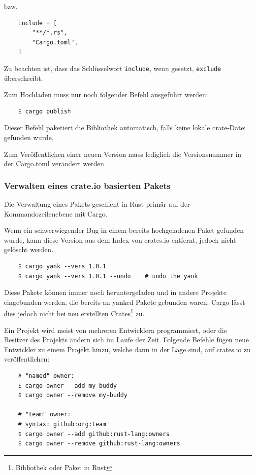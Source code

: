 bzw.

\begin{lstlisting}
    include = [
        "**/*.rs",
        "Cargo.toml",
    ]
\end{lstlisting}

Zu beachten ist, dass das Schlüsselwort \verb"include", wenn gesetzt, \verb"exclude" überschreibt.

Zum Hochladen muss nur noch folgender Befehl ausgeführt werden:

\begin{lstlisting}
    $ cargo publish
\end{lstlisting}

Dieser Befehl paketiert die Bibliothek automatisch, falls keine lokale crate-Datei gefunden wurde.

Zum Veröffentlichen einer neuen Version muss lediglich die Versionsnummer in der Cargo.toml verändert werden.

\subsubsection{Verwalten eines crate.io basierten Pakets}

Die Verwaltung eines Pakets geschieht in Rust primär auf der Kommandozeilenebene mit Cargo.

Wenn ein schwerwiegender Bug in einem bereits hochgeladenen Paket gefunden wurde, kann diese Version aus dem Index von crates.io entfernt, jedoch nicht gelöscht werden.

\begin{lstlisting}
    $ cargo yank --vers 1.0.1
    $ cargo yank --vers 1.0.1 --undo    # undo the yank
\end{lstlisting}

Diese Pakete können immer noch heruntergeladen und in andere Projekte eingebunden werden, die bereits an \glqq yanked\grqq{} Pakete gebunden waren. Cargo lässt dies jedoch nicht bei neu erstellten Crates\footnote{Bibliothek oder Paket in Rust} zu.

Ein Projekt wird meist von mehreren Entwicklern programmiert, oder die Besitzer des Projekts ändern sich im Laufe der Zeit. Folgende Befehle fügen neue Entwickler zu einem Projekt hinzu, welche dann in der Lage sind, auf crates.io zu veröffentlichen:

\begin{lstlisting}
    # "named" owner:
    $ cargo owner --add my-buddy
    $ cargo owner --remove my-buddy

    # "team" owner:
    # syntax: github:org:team
    $ cargo owner --add github:rust-lang:owners
    $ cargo owner --remove github:rust-lang:owners
\end{lstlisting}


